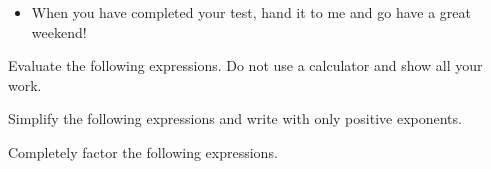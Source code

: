 \documentclass[12pt,letterpaper]{exam}
\begin{document}
\begin{itemize}

\item When you have completed your test, hand it to me and go have a great weekend!


\end{itemize}

\newpage

\begin{questions}
\addpoints
\question Evaluate the following expressions.  Do not use a calculator and show all your work.


\question Simplify the following expressions and write with only positive exponents.


\newpage 
\addpoints

\question Completely factor the following expressions.
\end{questions}
\end{document}
